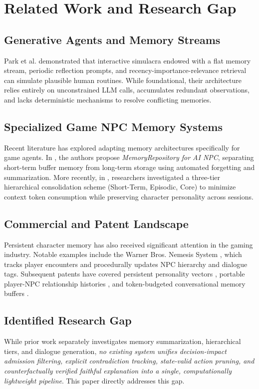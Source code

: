 \documentclass[conference]{IEEEtran}
\begin{document}
\section{Related Work and Research Gap}

\subsection{Generative Agents and Memory Streams}
Park et al. \cite{park2023generative} demonstrated that interactive simulacra endowed with a flat memory stream, periodic reflection prompts, and recency-importance-relevance retrieval can simulate plausible human routines. While foundational, their architecture relies entirely on unconstrained LLM calls, accumulates redundant observations, and lacks deterministic mechanisms to resolve conflicting memories.

\subsection{Specialized Game NPC Memory Systems}
Recent literature has explored adapting memory architectures specifically for game agents. In \cite{access2024memory}, the authors propose \textit{MemoryRepository for AI NPC}, separating short-term buffer memory from long-term storage using automated forgetting and summarization. More recently, in \cite{ssrn2026hierarchical}, researchers investigated a three-tier hierarchical consolidation scheme (Short-Term, Episodic, Core) to minimize context token consumption while preserving character personality across sessions.

\subsection{Commercial and Patent Landscape}
Persistent character memory has also received significant attention in the gaming industry. Notable examples include the Warner Bros. Nemesis System \cite{nemesisPatent}, which tracks player encounters and procedurally updates NPC hierarchy and dialogue tags. Subsequent patents have covered persistent personality vectors \cite{personalityPatent}, portable player-NPC relationship histories \cite{portablePatent}, and token-budgeted conversational memory buffers \cite{budgetPatent}.

\subsection{Identified Research Gap}
While prior work separately investigates memory summarization, hierarchical tiers, and dialogue generation, \textit{no existing system unifies decision-impact admission filtering, explicit contradiction tracking, state-valid action pruning, and counterfactually verified faithful explanation into a single, computationally lightweight pipeline}. This paper directly addresses this gap.
\end{document}
